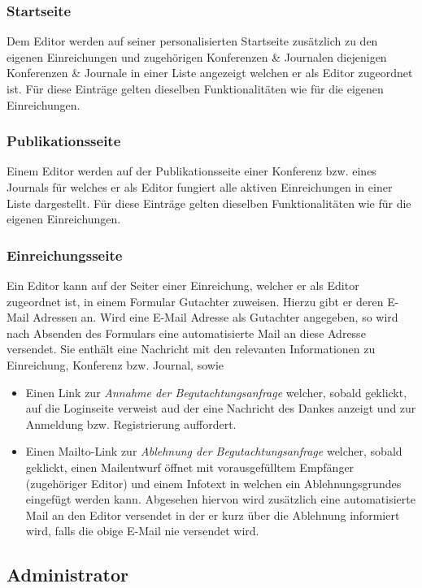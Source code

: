 \subsubsection{Startseite}
\begin{description}
    \XXitem{}{} Dem Editor werden auf seiner personalisierten Startseite zusätzlich zu den eigenen
    Einreichungen und zugehörigen Konferenzen \& Journalen diejenigen Konferenzen \& Journale in einer
    Liste angezeigt welchen er als Editor zugeordnet ist.
    Für diese Einträge gelten dieselben Funktionalitäten wie für die eigenen Einreichungen. %
\end{description}

\subsubsection{Publikationsseite}
\begin{description}
    \XXitem{}{} Einem Editor werden auf der Publikationsseite einer Konferenz bzw. eines Journals für
    welches er als Editor fungiert alle aktiven Einreichungen in einer Liste dargestellt.
    Für diese Einträge gelten dieselben Funktionalitäten wie für die eigenen Einreichungen. %
\end{description}

\subsubsection{Einreichungsseite}
\begin{description}
    \XXitem{}{} Ein Editor kann auf der Seiter einer Einreichung, welcher er als Editor zugeordnet ist,
    in einem Formular Gutachter zuweisen. Hierzu gibt er deren E-Mail Adressen an.
    \XXitem{}{} Wird eine E-Mail Adresse als Gutachter angegeben, so wird nach Absenden des Formulars
    eine automatisierte Mail an diese Adresse versendet. Sie enthält eine Nachricht mit den relevanten
    Informationen zu Einreichung, Konferenz bzw. Journal, sowie
    \begin{itemize}
        \item Einen Link zur \emph{Annahme der Begutachtungsanfrage} welcher, sobald geklickt,
        auf die Loginseite verweist aud der eine Nachricht des Dankes anzeigt und zur Anmeldung bzw.
        Registrierung auffordert.
        \item Einen Mailto-Link zur \emph{Ablehnung der Begutachtungsanfrage} welcher, sobald
        geklickt, einen Mailentwurf öffnet mit vorausgefülltem Empfänger (zugehöriger Editor)
        und einem Infotext in welchen ein Ablehnungsgrundes eingefügt werden kann.
        Abgesehen hiervon wird zusätzlich eine automatisierte Mail an den Editor versendet in der er
        kurz über die Ablehnung informiert wird, falls die obige E-Mail nie versendet wird.
    \end{itemize}
\end{description}

\subsection{Administrator}

